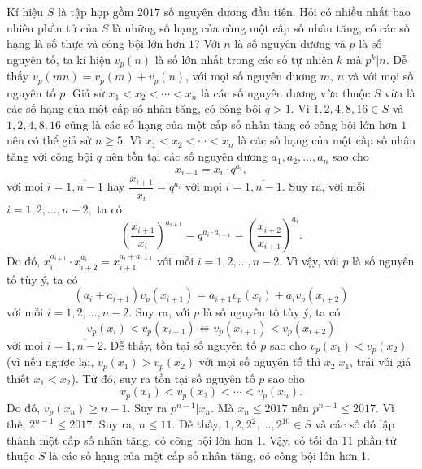\begin{bt}%
	Kí hiệu $ S $ là tập hợp gồm $ 2017 $ số nguyên dương đầu tiên. Hỏi có nhiều nhất bao nhiêu phần tử của $ S $ là những số hạng của cùng một cấp số nhân tăng, có các số hạng là số thực và công bội lớn hơn $ 1 $?
	\loigiai
	{Với $ n $ là số nguyên dương và $ p $ là số nguyên tố, ta kí hiệu $ v_p(n) $ là số lớn nhất trong các số tự nhiên $ k $ mà $ p^k | n$. Dễ thấy $v_p(mn)=v_p(m)+v_p(n)$, với mọi số nguyên dương $ m,\, n $ và với mọi số nguyên tố $ p $.
		Giả sử $ x_1<x_2<\cdots<x_n $ là các số nguyên dương vừa thuộc $ S $ vừa là các số hạng của một cấp số nhân tăng, có công bội $ q>1. $
		Vì $ 1,2,4,8,16 \in S $ và $ 1,2,4,8,16 $ cũng là các số hạng của một cấp số nhân tăng có công bội lớn hơn $ 1 $ nên có thể giả sử $ n\ge 5. $ Vì $ x_1<x_2<\cdots<x_n $ là các số hạng của một cấp số nhân tăng với công bội $ q $ nên tồn tại các số nguyên dương $ a_1, a_2,\ldots,a_n $ sao cho $$x_{i+1}=x_i\cdot q^{a_i},$$ với mọi $ i=\overline{1,n-1} $ hay $ \dfrac{x_{i+1}}{x_i} = q^{a_i} $ với mọi $i=\overline{1,n-1}  $. Suy ra, với mỗi $ i=1,2,\ldots,n-2, $ ta có
		$$\left(\dfrac{x_{i+1}}{x_i}\right)^{a_{i+1}}=q^{a_i\cdot a_{i+1}}=\left(\dfrac{x_{i+2}}{x_{i+1}}\right)^{a_i}.$$
		Do đó, $ x_i^{a_{i+1}}\cdot x_{i+2}^{a_{i}}=x_{i+1}^{a_i+a_{i+1}} $ với mỗi $ i=1,2,\ldots,n-2. $ 
		Vì vậy, với $ p $ là số nguyên tố tùy ý, ta có
		$$\left(a_i+a_{i+1}\right)v_p\left(x_{i+1}\right)=a_{i+1}v_p\left(x_i\right)+a_iv_p\left(x_{i+2}\right)$$ với mỗi $ i=1,2,\ldots,n-2. $
		Suy ra, với $ p $ là số nguyên tố tùy ý, ta có $$v_p\left(x_i\right)<v_p\left(x_{i+1}\right) \Leftrightarrow v_p\left(x_{i+1}\right)<v_p\left(x_{i+2}\right)$$ với mọi $ i=\overline{1,n-2} .$
		Dễ thấy, tồn tại số nguyên tố $ p $ sao cho $ v_p\left(x_1\right) <v_p\left(x_2\right)$ (vì nếu ngược lại, $ v_p\left(x_1\right)>v_p\left(x_2\right) $ với mọi số nguyên tố thì $ x_2|x_1 $, trái với giả thiết $ x_1<x_2 $).
		Từ đó, suy ra tồn tại số nguyên tố $ p $ sao cho $$v_p\left(x_1\right)<v_p\left(x_2\right)<\cdots<v_p\left(x_n\right).$$
		Do đó, $ v_p\left(x_n\right)\ge n-1. $ Suy ra $ p^{n-1} | x_n $. Mà $ x_n \le 2017 $ nên $ p^{n-1}\le 2017. $
		Vì thế, $ 2^{n-1} \le 2017 $. Suy ra, $ n\le 11 $.
		Dễ thấy, $ 1,2,2^2,\ldots,2^{10} \in S$ và các số đó lập thành một cấp số nhân tăng, có công bội lớn hơn $ 1 $. Vậy, có tối đa $ 11 $ phần tử thuộc $ S $ là các số hạng của một cấp số nhân tăng, có công bội lớn hơn 1.
	}
\end{bt}
